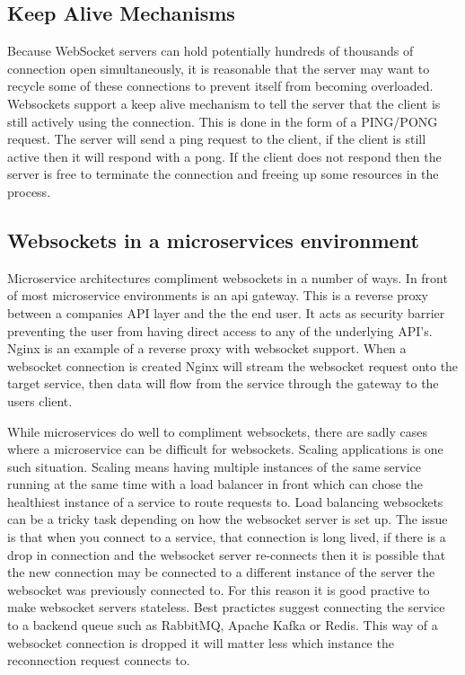\subsection{Keep Alive Mechanisms}

Because WebSocket servers can hold potentially hundreds of thousands of connection open simultaneously, it is reasonable that the server may want to recycle some of these connections to prevent itself from becoming overloaded. Websockets support a keep alive mechanism to tell the server that the client is still actively using the connection. This is done in the form of a PING/PONG request. The server will send a ping request to the client, if the client is still active then it will respond with a pong. If the client does not respond then the server is free to terminate the connection and freeing up some resources in the process. 

\subsection{Websockets in a microservices environment}

Microservice architectures compliment websockets in a number of ways. In front of most microservice environments is an api gateway\cite{6885428}. This is a reverse proxy between a companies API layer and the the end user. It acts as security barrier preventing the user from having direct access to any of the underlying API's. Nginx is an example of a reverse proxy with websocket support. When a websocket connection is created Nginx will stream the websocket request onto the target service, then data will flow from the service through the gateway to the users client. 

While microservices do well to compliment websockets, there are sadly cases where a microservice can be difficult for websockets. Scaling applications is one such situation. Scaling means having multiple instances of the same service running at the same time with a load balancer in front which can chose the healthiest instance of a service to route requests to. Load balancing websockets can be a tricky task depending on how the websocket server is set up. The issue is that when you connect to a service, that connection is long lived, if there is a drop in connection and the websocket server re-connects then it is possible that the new connection may be connected to a different instance of the server the websocket was previously connected to. For this reason it is good practive to make websocket servers stateless. Best practictes suggest connecting the service to a backend queue such as RabbitMQ, Apache Kafka or Redis. This way of a websocket connection is dropped it will matter less which instance the reconnection request connects to.


